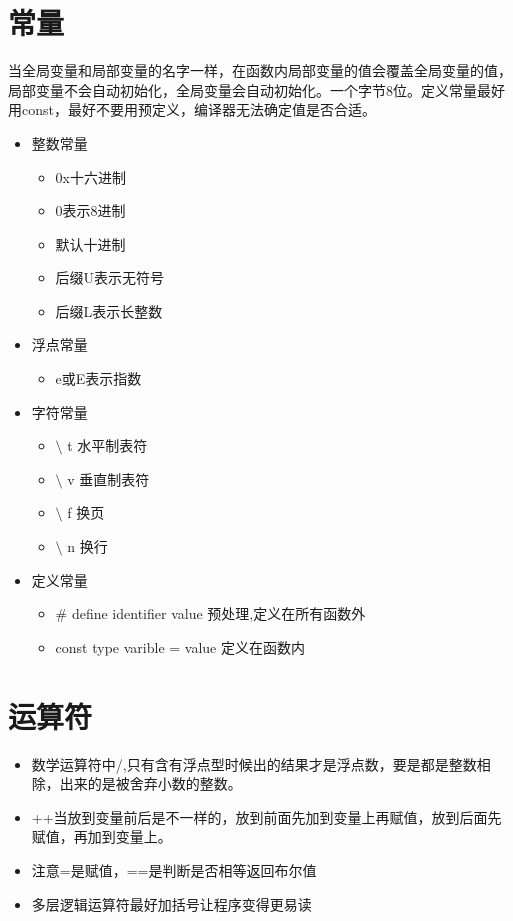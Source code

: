 \documentclass{article}
\begin{document}
\section{常量}
当全局变量和局部变量的名字一样，在函数内局部变量的值会覆盖全局变量的值，局部变量不会自动初始化，全局变量会自动初始化。一个字节8位。定义常量最好用const，最好不要用预定义，编译器无法确定值是否合适。
\begin{itemize}
\item 整数常量
\begin{itemize}
\item 0x十六进制
\item 0表示8进制
\item 默认十进制
\item 后缀U表示无符号
\item 后缀L表示长整数
\end{itemize}
\item 浮点常量
\begin{itemize}
\item e或E表示指数
\end{itemize}
\item 字符常量
\begin{itemize}
\item $\setminus$ t 水平制表符
\item $\setminus$ v 垂直制表符
\item $\setminus$ f 换页
\item $\setminus$ n 换行
\end{itemize}
\item 定义常量
\begin{itemize}
\item \# define identifier value 预处理,定义在所有函数外
\item const type varible = value 定义在函数内
\end{itemize}
\end{itemize}

\section{运算符}
\begin{itemize}
\item 数学运算符中/,只有含有浮点型时候出的结果才是浮点数，要是都是整数相除，出来的是被舍弃小数的整数。
\item ++当放到变量前后是不一样的，放到前面先加到变量上再赋值，放到后面先赋值，再加到变量上。
\item 注意=是赋值，==是判断是否相等返回布尔值
\item 多层逻辑运算符最好加括号让程序变得更易读
\end{itemize}
\end{document}
